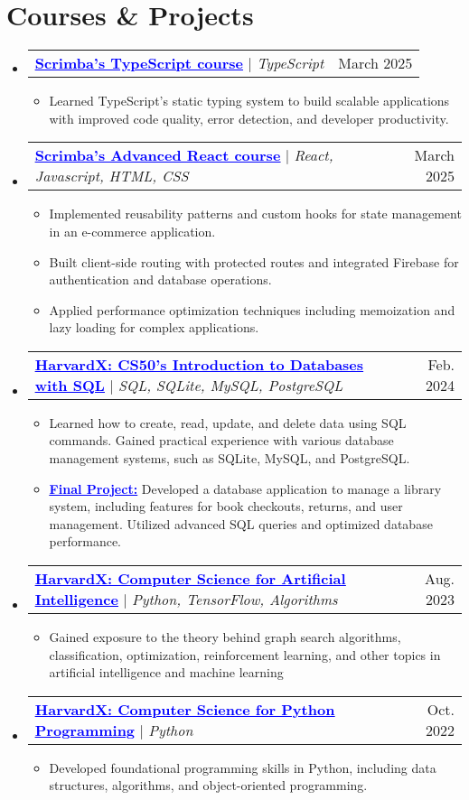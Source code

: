 \documentclass[letterpaper,11pt]{article}
\makeatletter
\newcommand{\resumeItem}[1]{
  \item\small{
    {#1 \vspace{-2pt}}
  }
}
\newcommand{\resumeProjectHeading}[2]{
    \item
    \begin{tabular*}{0.97\textwidth}{l@{\extracolsep{\fill}}r}
      \small#1 & #2 \\
    \end{tabular*}\vspace{-7pt}
}
\newcommand{\resumeSubHeadingListStart}{\begin{itemize}[leftmargin=0.15in, label={}]}
\newcommand{\resumeSubHeadingListEnd}{\end{itemize}}
\newcommand{\resumeItemListStart}{\begin{itemize}}
\newcommand{\resumeItemListEnd}{\end{itemize}\vspace{-5pt}}
\makeatother
\begin{document}
\section{Courses \& Projects}
    \resumeSubHeadingListStart
      \resumeProjectHeading
      {\href{https://scrimba.com/certificate-cert2JbLs3qgAvqsGYGNk8Lo7ZxypG3YWxSKV9FvHY}{\textcolor{blue}{\underline{\textbf{Scrimba's TypeScript course}}}} $|$ \emph{TypeScript}}{March 2025}
      \resumeItemListStart
        \resumeItem{Learned TypeScript's static typing system to build scalable applications with improved code quality, error detection, and developer productivity.}
      \resumeItemListEnd
      \resumeProjectHeading
          {\href{https://scrimba.com/certificate-cert2JbLs3qgAvqsGYGNk8Lo7ZwuaExT36m3wCB6rR}{\textcolor{blue}{\underline{\textbf{Scrimba's Advanced React course}}}} $|$ \emph{React, Javascript, HTML, CSS}}{March 2025}
          \resumeItemListStart
            \resumeItem{Implemented reusability patterns and custom hooks for state management in an e-commerce application.}
            \resumeItem{Built client-side routing with protected routes and integrated Firebase for authentication and database operations.}
            \resumeItem{Applied performance optimization techniques including memoization and lazy loading for complex applications.}
          \resumeItemListEnd
      \resumeProjectHeading
          {\href{https://certificates.cs50.io/b41cb19f-0117-4da6-af42-80cfa762c907.pdf}{\textcolor{blue}{\underline{\textbf{HarvardX: CS50’s Introduction to Databases with SQL}}}} $|$ \emph{SQL, SQLite, MySQL, PostgreSQL}}{Feb. 2024}
          \resumeItemListStart
            \resumeItem{Learned how to create, read, update, and delete data using SQL commands. Gained practical experience with various database management systems, such as SQLite, MySQL, and PostgreSQL.}
            \resumeItem{\textbf{\href{https://github.com/KhalidAlansary/CS50SQL-Final-Project}{\textcolor{blue}{\underline{Final Project:}}}} Developed a database application to manage a library system, including features for book checkouts, returns, and user management. Utilized advanced SQL queries and optimized database performance.}
          \resumeItemListEnd
      \resumeProjectHeading
          {\href{https://credentials.edx.org/credentials/a45ff39483ed4a8db7a6a667b469e3f8}{\textcolor{blue}{\underline{\textbf{HarvardX: Computer Science for Artificial Intelligence}}}} $|$ \emph{Python, TensorFlow, Algorithms}}{Aug. 2023}
          \resumeItemListStart
            \resumeItem{Gained exposure to the theory behind graph search algorithms, classification, optimization, reinforcement learning, and other topics in artificial intelligence and machine learning}
          \resumeItemListEnd
          \resumeProjectHeading
          {\href{https://credentials.edx.org/credentials/e7d7299163254a00893a05a9f4cba807}{\textcolor{blue}{\underline{\textbf{HarvardX: Computer Science for Python Programming}}}} $|$ \emph{Python}}{Oct. 2022}
          \resumeItemListStart
            \resumeItem{Developed foundational programming skills in Python, including data structures, algorithms, and object-oriented programming.}
          \resumeItemListEnd
    \resumeSubHeadingListEnd
\end{document}
